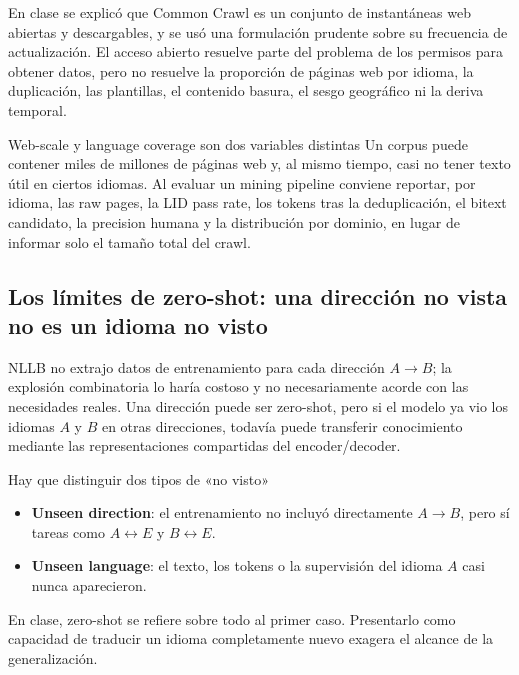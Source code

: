 En clase se explicó que Common Crawl es un conjunto de instantáneas web abiertas y descargables, y se usó una formulación prudente sobre su frecuencia de actualización. El acceso abierto resuelve parte del problema de los permisos para obtener datos, pero no resuelve la proporción de páginas web por idioma, la duplicación, las plantillas, el contenido basura, el sesgo geográfico ni la deriva temporal.

\begin{warningbox}{Web-scale y language coverage son dos variables distintas}
Un corpus puede contener miles de millones de páginas web y, al mismo tiempo, casi no tener texto útil en ciertos idiomas. Al evaluar un mining pipeline conviene reportar, por idioma, las raw pages, la LID pass rate, los tokens tras la deduplicación, el bitext candidato, la precision humana y la distribución por dominio, en lugar de informar solo el tamaño total del crawl.
\end{warningbox}

\subsection{Los límites de zero-shot: una dirección no vista no es un idioma no visto}

NLLB no extrajo datos de entrenamiento para cada dirección $A\rightarrow B$; la explosión combinatoria lo haría costoso y no necesariamente acorde con las necesidades reales. Una dirección puede ser zero-shot, pero si el modelo ya vio los idiomas $A$ y $B$ en otras direcciones, todavía puede transferir conocimiento mediante las representaciones compartidas del encoder/decoder.

\begin{importantbox}{Hay que distinguir dos tipos de «no visto»}
\begin{itemize}
  \item \textbf{Unseen direction}: el entrenamiento no incluyó directamente $A\rightarrow B$, pero sí tareas como $A\leftrightarrow E$ y $B\leftrightarrow E$.
  \item \textbf{Unseen language}: el texto, los tokens o la supervisión del idioma $A$ casi nunca aparecieron.
\end{itemize}
En clase, zero-shot se refiere sobre todo al primer caso. Presentarlo como capacidad de traducir un idioma completamente nuevo exagera el alcance de la generalización.
\end{importantbox}


